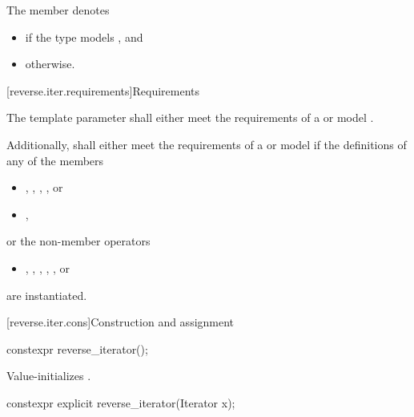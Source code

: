 \pnum
The member   denotes
\begin{itemize}
\item
{} if
the type
 models
, and
\item
{} otherwise.
\end{itemize}

[reverse.iter.requirements]{Requirements}

\pnum
The template parameter
shall either meet the requirements of a
or model
.

\pnum
Additionally,
shall either meet the requirements of a
or model
if the definitions of any of the members
\begin{itemize}
\item
{},
,
,
, or
\item
{},
\end{itemize}
or the non-member operators
\begin{itemize}
\item
{},
,
,
,
,
or
\end{itemize}
are instantiated.

[reverse.iter.cons]{Construction and assignment}

%
\begin{itemdecl}
constexpr reverse_iterator();
\end{itemdecl}

\begin{itemdescr}
\pnum
\effects
Value-initializes
.
\end{itemdescr}

%
\begin{itemdecl}
constexpr explicit reverse_iterator(Iterator x);
\end{itemdecl}

